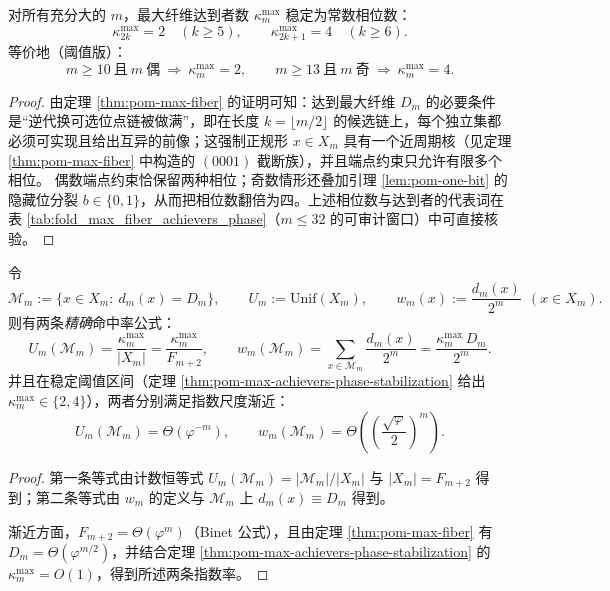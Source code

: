 \begin{theorem}[最大纤维达到者的相位数稳定化]\label{thm:pom-max-achievers-phase-stabilization}
对所有充分大的 \(m\)，最大纤维达到者数 \(\kappa_m^{\mathrm{max}}\) 稳定为常数相位数：
\[
\kappa_{2k}^{\mathrm{max}}=2\quad(k\ge 5),
\qquad
\kappa_{2k+1}^{\mathrm{max}}=4\quad(k\ge 6).
\]
等价地（阈值版）：
\[
m\ge 10\ \text{且}\ m\ \text{偶}\ \Rightarrow\ \kappa_m^{\mathrm{max}}=2,
\qquad
m\ge 13\ \text{且}\ m\ \text{奇}\ \Rightarrow\ \kappa_m^{\mathrm{max}}=4.
\]
\end{theorem}
\begin{proof}
由定理 \ref{thm:pom-max-fiber} 的证明可知：达到最大纤维 \(D_m\) 的必要条件是“逆代换可选位点链被做满”，即在长度 \(k=\lfloor m/2\rfloor\) 的候选链上，每个独立集都必须可实现且给出互异的前像；这强制正规形 \(x\in X_m\) 具有一个近周期核（见定理 \ref{thm:pom-max-fiber} 中构造的 \((0001)\) 截断族），并且端点约束只允许有限多个相位。
偶数端点约束恰保留两种相位；奇数情形还叠加引理 \ref{lem:pom-one-bit} 的隐藏位分裂 \(b\in\{0,1\}\)，从而把相位数翻倍为四。上述相位数与达到者的代表词在表 \ref{tab:fold_max_fiber_achievers_phase}（\(m\le 32\) 的可审计窗口）中可直接核验。
\end{proof}

\begin{corollary}[最大纤维达到者在两种自然测度下的指数稀薄率]\label{cor:pom-maxfiber-rarity-two-measures}
令
\[
\mathcal{M}_m:=\{x\in X_m:\ d_m(x)=D_m\},
\qquad
U_m:=\mathrm{Unif}(X_m),
\qquad
w_m(x):=\frac{d_m(x)}{2^m}\ \ (x\in X_m).
\]
则有两条\emph{精确}命中率公式：
\[
U_m(\mathcal{M}_m)=\frac{\kappa_m^{\mathrm{max}}}{|X_m|}
=\frac{\kappa_m^{\mathrm{max}}}{F_{m+2}},
\qquad
w_m(\mathcal{M}_m)=\sum_{x\in\mathcal{M}_m}\frac{d_m(x)}{2^m}
=\frac{\kappa_m^{\mathrm{max}}\,D_m}{2^m}.
\]
并且在稳定阈值区间（定理 \ref{thm:pom-max-achievers-phase-stabilization} 给出 \(\kappa_m^{\mathrm{max}}\in\{2,4\}\)），两者分别满足指数尺度渐近：
\[
U_m(\mathcal{M}_m)=\Theta(\varphi^{-m}),
\qquad
w_m(\mathcal{M}_m)=\Theta\!\left(\left(\frac{\sqrt{\varphi}}{2}\right)^m\right).
\]
\end{corollary}
\begin{proof}
第一条等式由计数恒等式 \(U_m(\mathcal{M}_m)=|\mathcal{M}_m|/|X_m|\) 与 \(|X_m|=F_{m+2}\) 得到；第二条等式由 \(w_m\) 的定义与 \(\mathcal{M}_m\) 上 \(d_m(x)\equiv D_m\) 得到。
\par
渐近方面，\(F_{m+2}=\Theta(\varphi^m)\)（Binet 公式），且由定理 \ref{thm:pom-max-fiber} 有 \(D_m=\Theta(\varphi^{m/2})\)，并结合定理 \ref{thm:pom-max-achievers-phase-stabilization} 的 \(\kappa_m^{\mathrm{max}}=O(1)\)，得到所述两条指数率。
\end{proof}

